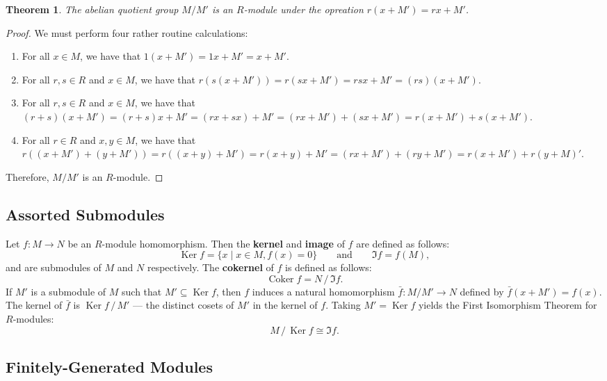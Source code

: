 \documentclass[11pt]{article}
\newtheorem{theorem}{Theorem}
\newcommand{\Ker}{\operatorname{Ker}}
\newcommand{\Coker}{\operatorname{Coker}}
\begin{document}
\begin{adjustwidth}{1cm}{}
	\begin{theorem}
		The abelian quotient group $M / M'$ is an $R$-module under the opreation $r(x + M') = rx + M'$.
	\end{theorem}
	\begin{proof}
		We must perform four rather routine calculations:
		\begin{enumerate}
			\item For all $x \in M$, we have that $1(x + M') = 1x + M' = x + M'$.
			\item For all $r, s \in R$ and $x \in M$, we have that $r(s(x + M')) = r(sx + M') = rsx + M' = (rs)(x + M')$.
			\item For all $r, s \in R$ and $x \in M$, we have that $(r + s)(x + M') = (r + s)x + M' = (rx + sx) + M' = (rx + M') + (sx + M') = r(x + M') + s(x + M')$.
			\item For all $r \in R$ and $x, y \in M$, we have that $r((x + M') + (y + M')) = r((x + y) + M') = r(x + y) + M' = (rx + M') + (ry + M') = r(x + M') + r(y + M)'$.
		\end{enumerate}
		Therefore, $M / M'$ is an $R$-module.
	\end{proof}
\end{adjustwidth}


\subsection{Assorted Submodules}

Let $f : M \to N$ be an $R$-module homomorphism. Then the \textbf{kernel} and \textbf{image} of $f$ are defined as follows:
\[
	\Ker f = \{ x \mid x \in M, f(x) = 0 \} \qquad \text{and} \qquad \Im f = f(M),
\]
and are submodules of $M$ and $N$ respectively. The \textbf{cokernel} of $f$ is defined as follows:
\[
	\Coker f = N \,/\, \Im f.
\]
If $M'$ is a submodule of $M$ such that $M' \subseteq \Ker f$, then $f$ induces a natural homomorphism $\bar{f} : M / M' \to N$ defined by $\bar{f}(x + M') = f(x)$. The kernel of $\bar{f}$ is $\Ker f \,/\, M'$ --- the distinct cosets of $M'$ in the kernel of $f$. Taking $M' = \Ker f$ yields the First Isomorphism Theorem for $R$-modules:
\[
	M \,/\, \Ker f \cong \Im f.
\]

\newpage


\subsection{Finitely-Generated Modules}
\end{document}
